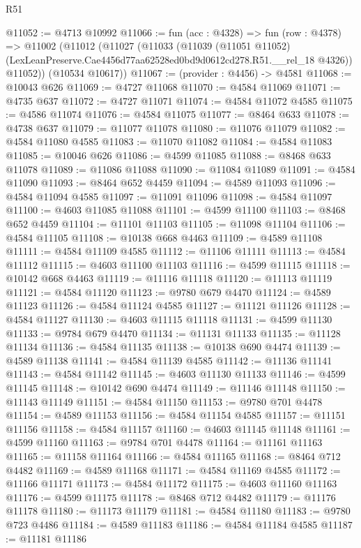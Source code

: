 \begin{lexlean}{R51}
\begin{coremodule}
@11052 := @4713 @10992
@11066 := fun (acc : @4328) =>
  fun (row : @4378) =>
  @11002
    (@11012
      (@11027
        (@11033
          (@11039
            (@11051 @11052)
            (LexLeanPreserve.Cae4456d77aa62528ed0bd9d0612cd278.R51.__rel_18 @4326))
          @11052))
      (@10534 @10617))
@11067 := (provider : @4456) -> @4581
@11068 := @10043 @626
@11069 := @4727 @11068
@11070 := @4584 @11069
@11071 := @4735 @637
@11072 := @4727 @11071
@11074 := @4584 @11072 @4585
@11075 := @4586 @11074
@11076 := @4584 @11075
@11077 := @8464 @633
@11078 := @4738 @637
@11079 := @11077 @11078
@11080 := @11076 @11079
@11082 := @4584 @11080 @4585
@11083 := @11070 @11082
@11084 := @4584 @11083
@11085 := @10046 @626
@11086 := @4599 @11085
@11088 := @8468 @633 @11078
@11089 := @11086 @11088
@11090 := @11084 @11089
@11091 := @4584 @11090
@11093 := @8464 @652 @4459
@11094 := @4589 @11093
@11096 := @4584 @11094 @4585
@11097 := @11091 @11096
@11098 := @4584 @11097
@11100 := @4603 @11085 @11088
@11101 := @4599 @11100
@11103 := @8468 @652 @4459
@11104 := @11101 @11103
@11105 := @11098 @11104
@11106 := @4584 @11105
@11108 := @10138 @668 @4463
@11109 := @4589 @11108
@11111 := @4584 @11109 @4585
@11112 := @11106 @11111
@11113 := @4584 @11112
@11115 := @4603 @11100 @11103
@11116 := @4599 @11115
@11118 := @10142 @668 @4463
@11119 := @11116 @11118
@11120 := @11113 @11119
@11121 := @4584 @11120
@11123 := @9780 @679 @4470
@11124 := @4589 @11123
@11126 := @4584 @11124 @4585
@11127 := @11121 @11126
@11128 := @4584 @11127
@11130 := @4603 @11115 @11118
@11131 := @4599 @11130
@11133 := @9784 @679 @4470
@11134 := @11131 @11133
@11135 := @11128 @11134
@11136 := @4584 @11135
@11138 := @10138 @690 @4474
@11139 := @4589 @11138
@11141 := @4584 @11139 @4585
@11142 := @11136 @11141
@11143 := @4584 @11142
@11145 := @4603 @11130 @11133
@11146 := @4599 @11145
@11148 := @10142 @690 @4474
@11149 := @11146 @11148
@11150 := @11143 @11149
@11151 := @4584 @11150
@11153 := @9780 @701 @4478
@11154 := @4589 @11153
@11156 := @4584 @11154 @4585
@11157 := @11151 @11156
@11158 := @4584 @11157
@11160 := @4603 @11145 @11148
@11161 := @4599 @11160
@11163 := @9784 @701 @4478
@11164 := @11161 @11163
@11165 := @11158 @11164
@11166 := @4584 @11165
@11168 := @8464 @712 @4482
@11169 := @4589 @11168
@11171 := @4584 @11169 @4585
@11172 := @11166 @11171
@11173 := @4584 @11172
@11175 := @4603 @11160 @11163
@11176 := @4599 @11175
@11178 := @8468 @712 @4482
@11179 := @11176 @11178
@11180 := @11173 @11179
@11181 := @4584 @11180
@11183 := @9780 @723 @4486
@11184 := @4589 @11183
@11186 := @4584 @11184 @4585
@11187 := @11181 @11186

\end{coremodule}
\end{lexlean}
